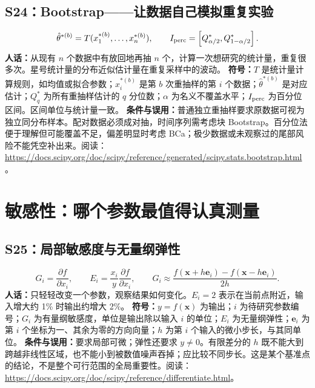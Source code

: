 \subsection{S24：Bootstrap——让数据自己模拟重复实验}
\begin{equation}
 \hat\theta^{*(b)}=T(x_1^{*(b)},\ldots,x_n^{*(b)}),\qquad
 I_{\rm perc}=\left[Q^*_{\alpha/2},Q^*_{1-\alpha/2}\right].
\end{equation}
\textbf{人话：}从现有 $n$ 个数据中有放回地再抽 $n$ 个，计算一次想研究的统计量，重复很多次。星号统计量的分布近似估计量在重复采样中的波动。
\textbf{符号：}$T$ 是统计量计算规则，如均值或拟合参数；$x_i^{*(b)}$ 是第 $b$ 次重抽样的第 $i$ 个数据；$\hat\theta^{*(b)}$ 是对应估计；$Q_q^*$ 为所有重抽样估计的 $q$ 分位数；$\alpha$ 为名义不覆盖水平；$I_{\rm perc}$ 为百分位区间。区间单位与统计量一致。
\textbf{条件与误用：}普通独立重抽样要求原数据可视为独立同分布样本。配对数据必须成对抽，时间序列需考虑块 Bootstrap。百分位法便于理解但可能覆盖不足，偏差明显时考虑 BCa；极少数据或未观察过的尾部风险不能凭空补出来。阅读：\url{https://docs.scipy.org/doc/scipy/reference/generated/scipy.stats.bootstrap.html}。

\section{敏感性：哪个参数最值得认真测量}
\subsection{S25：局部敏感度与无量纲弹性}
\begin{equation}
 G_i=\frac{\partial f}{\partial x_i},\qquad
 E_i=\frac{x_i}{y}\frac{\partial f}{\partial x_i},\qquad
 G_i\approx\frac{f(\mathbf x+h\mathbf e_i)-f(\mathbf x-h\mathbf e_i)}{2h}.
\end{equation}
\textbf{人话：}只轻轻改变一个参数，观察结果如何变化。$E_i=2$ 表示在当前点附近，输入增大约 1\% 时输出约增大 2\%。
\textbf{符号：}$y=f(\mathbf x)$ 为输出；$i$ 为待研究参数编号；$G_i$ 为有量纲敏感度，单位是输出除以输入 $i$ 的单位；$E_i$ 为无量纲弹性；$\mathbf e_i$ 为第 $i$ 个坐标为一、其余为零的方向向量；$h$ 为第 $i$ 个输入的微小步长，与其同单位。
\textbf{条件与误用：}要求局部可微；弹性还要求 $y\ne0$。有限差分的 $h$ 既不能大到跨越非线性区域，也不能小到被数值噪声吞掉；应比较不同步长。这是某个基准点的结论，不是整个可行范围的全局重要性。阅读：\url{https://docs.scipy.org/doc/scipy/reference/differentiate.html}。

